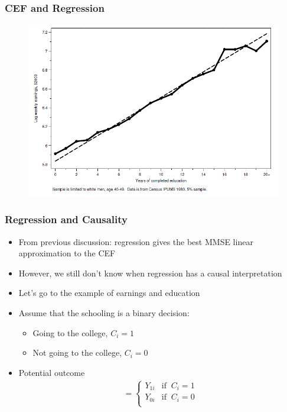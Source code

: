 \documentclass{beamer}
\theoremstyle{plain}
\begin{document}
\begin{frame}
	\frametitle{CEF and Regression}
	\begin{figure}
		\centering
		\includegraphics[width=\linewidth]{figures/mhe_fig_312}
	\end{figure}
\end{frame}

\begin{frame}
\frametitle{Regression and Causality}
\begin{itemize}
	\item From previous discussion: regression gives the best MMSE linear approximation to the CEF
	\item However, we still don't know when regression has a causal interpretation
	\item Let's go to the example of earnings and education
	\item Assume that the schooling is a binary decision:
		\begin{itemize}
				\item Going to the college, $C_i = 1$
				\item Not going to the college, $C_i = 0$
			\end{itemize}
	\item Potential outcome
		\begin{align*}
			= \left\{\begin{array}{cc}
				Y_{1i} & \text{if} \;\; C_i = 1\\
				Y_{0i} & \text{if} \;\; C_i = 0\\
				\end{array} \right.
			\end{align*}
\end{itemize}
\end{frame}
\end{document}
